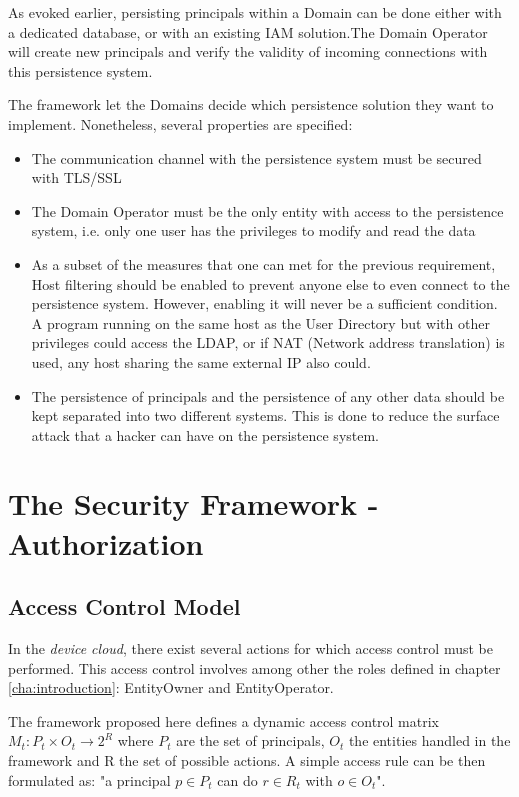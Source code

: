 As evoked earlier, persisting principals within a Domain can be done either with a dedicated database, or with an existing IAM solution.The Domain Operator will create new principals and verify the validity of incoming connections with this persistence system.

The framework let the Domains decide which persistence solution they want to implement. Nonetheless, several properties are specified:

\label{LDAP_security}
\begin{itemize}
	\item The communication channel with the persistence system must be secured with TLS/SSL
	\item The Domain Operator must be the only entity with access to the persistence system, i.e. only one user has the privileges to modify and read the data
	\item As a subset of the measures that one can met for the previous requirement, Host filtering should be enabled to prevent anyone else to even connect to the persistence system. However, enabling it will never be a sufficient condition. A program running on the same host as the User Directory but with other privileges could access the LDAP, or if NAT (Network address translation) is used, any host sharing the same external IP also could.
	\item The persistence of principals and the persistence of any other data should be kept separated into two different systems. This is done to reduce the surface attack that a hacker can have on the persistence system.
\end{itemize}

\section{The Security Framework - Authorization}
\label{03_authorizing}

\subsection{Access Control Model}

In the \emph{device cloud}, there exist several actions for which access control must be performed. This access control involves among other the roles defined in chapter \ref{cha:introduction}: EntityOwner and EntityOperator.

The framework proposed here defines a dynamic access control matrix $ M_{t}:  P_{t} \times O_{t} \rightarrow 2^{R}$ where $P_{t}$ are the set of principals,  $O_{t}$ the entities handled in the framework and R the set of possible actions. A simple access rule can be then formulated as: "a principal $p \in P_{t}$ can do $r \in R_{t}$ with $o \in O_{t}$".

